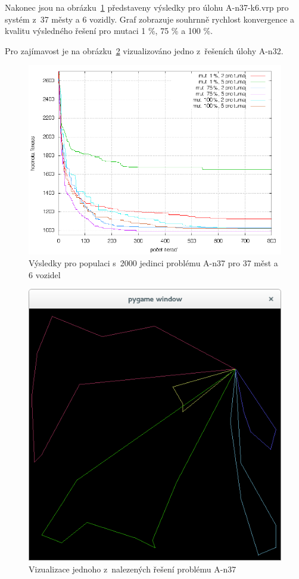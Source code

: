 \documentclass[a4paper]{article}
\begin{document}
Nakonec jsou na obrázku~\ref{fig:ntrisedm} představeny výsledky pro úlohu A-n37-k6.vrp pro systém z~37 městy a 6 vozidly. Graf zobrazuje souhrnně rychlost konvergence a kvalitu výsledného řešení pro mutaci 1 \%, 75 \% a 100 \%.

Pro zajímavost je na obrázku~\ref{fig:cesta} vizualizováno jedno z~řešeních úlohy A-n32.

\begin{figure}
\centering
\includegraphics[width=\textwidth]{ntrisedm.png}
\caption{Výsledky pro populaci s~2000 jedinci problému A-n37 pro 37 měst a 6 vozidel\label{fig:ntrisedm}}
\end{figure}

\begin{figure}
\centering
\includegraphics[width=\textwidth]{cesta.png}
\caption{Vizualizace jednoho z~nalezených řešení problému A-n37\label{fig:cesta}}
\end{figure}
\end{document}
